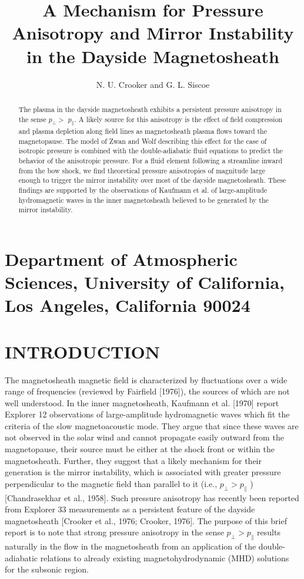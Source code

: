 \documentclass[10pt]{article}
\title{A Mechanism for Pressure Anisotropy and Mirror Instability in the Dayside Magnetosheath }
\author{N. U. Crooker and G. L. Siscoe}
\date{}
\begin{document}
\maketitle


\section{Department of Atmospheric Sciences, University of California, Los Angeles, California 90024}
\begin{abstract}
The plasma in the dayside magnetosheath exhibits a persistent pressure anisotropy in the sense $p_{\perp}>$ $p_{\parallel}$. A likely source for this anisotropy is the effect of field compression and plasma depletion along field lines as magnetosheath plasma flows toward the magnetopause. The model of Zwan and Wolf describing this effect for the case of isotropic pressure is combined with the double-adiabatic fluid equations to predict the behavior of the anisotropic pressure. For a fluid element following a streamline inward from the bow shock, we find theoretical pressure anisotropies of magnitude large enough to trigger the mirror instability over most of the dayside magnetosheath. These findings are supported by the observations of Kaufmann et al. of large-amplitude hydromagnetic waves in the inner magnetosheath believed to be generated by the mirror instability.
\end{abstract}

\section{INTRODUCTION}
The magnetosheath magnetic field is characterized by fluctuations over a wide range of frequencies (reviewed by Fairfield [1976]), the sources of which are not well understood. In the inner magnetosheath, Kaufmann et al. [1970] report Explorer 12 observations of large-amplitude hydromagnetic waves which fit the criteria of the slow magnetoacoustic mode. They argue that since these waves are not observed in the solar wind and cannot propagate easily outward from the magnetopause, their source must be either at the shock front or within the magnetosheath. Further, they suggest that a likely mechanism for their generation is the mirror instability, which is associated with greater pressure perpendicular to the magnetic field than parallel to it (i.e., $p_{\perp}>p_{\parallel}$ ) [Chandrasekhar et al., 1958]. Such pressure anisotropy has recently been reported from Explorer 33 measurements as a persistent feature of the dayside magnetosheath [Crooker et al., 1976; Crooker, 1976]. The purpose of this brief report is to note that strong pressure anisotropy in the sense $p_{\perp}>p_{\parallel}$ results naturally in the flow in the magnetosheath from an application of the double-adiabatic relations to already existing magnetohydrodynamic (MHD) solutions for the subsonic region.
\end{document}
